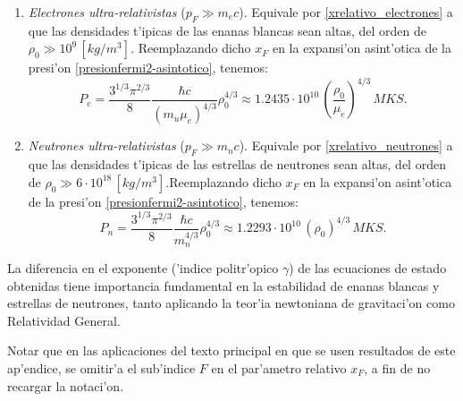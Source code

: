\begin{enumerate}
\begin{enumerate}
\item \emph{Electrones ultra-relativistas} ($p_F\gg m_{e}c$). Equivale por  \eqref{xrelativo_electrones} a que las densidades t'ipicas de las enanas blancas sean altas, del orden de $\rho_0\gg10^{9}\,[kg/m^3]$. Reemplazando dicho $x_F$ en la expansi'on asint'otica de la presi'on \eqref{presionfermi2-asintotico}, tenemos:
\begin{equation}\label{fermi_relativista}
 \boxed{P_e=\frac{3^{1/3}\pi^{2/3}}{8}\frac{\hbar c}{(m_u\mu_e)^{4/3}}\rho_0^{4/3}\approx1.2435\cdot 10^{10}\,\left(\frac{\rho_0}{\mu_e}\right)^{4/3}\,MKS.}
\end{equation}

\item \emph{Neutrones ultra-relativistas} ($p_F\gg m_{n}c$). Equivale por  \eqref{xrelativo_neutrones} a que las densidades t'ipicas de las estrellas de neutrones sean altas, del orden de $\rho_0\gg6\cdot10^{18}\,[kg/m^3]$.Reemplazando dicho $x_F$ en la expansi'on asint'otica de la presi'on \eqref{presionfermi2-asintotico}, tenemos:
\begin{equation}\label{fermi_relativista2}
 \boxed{P_n=\frac{3^{1/3}\pi^{2/3}}{8}\frac{\hbar c}{m_n^{4/3}}\rho_0^{4/3}\approx1.2293\cdot 10^{10}\,\left(\rho_0\right)^{4/3}\,MKS.}
\end{equation}

\end{enumerate}
\end{enumerate}

La diferencia en el exponente ('indice politr'opico $\gamma$) de las ecuaciones de estado obtenidas tiene importancia fundamental en la estabilidad de enanas blancas y estrellas de neutrones, tanto aplicando la teor'ia newtoniana de gravitaci'on como Relatividad General.

Notar que en las aplicaciones del texto principal en que se usen resultados de este ap'endice, se omitir'a el sub'indice $F$ en el par'ametro relativo $x_F$, a fin de no recargar la notaci'on.
